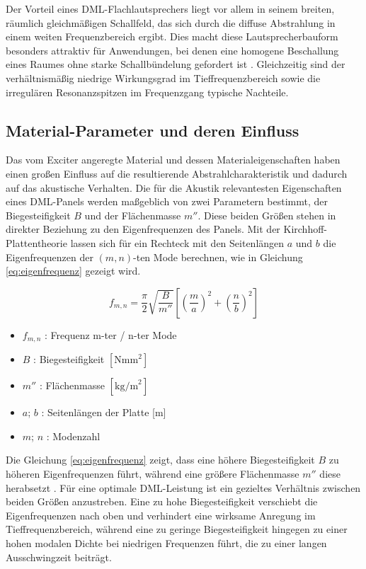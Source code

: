 Der Vorteil eines DML-Flachlautsprechers liegt vor allem in seinem breiten, räumlich gleichmäßigen Schallfeld, das sich durch die diffuse Abstrahlung in einem weiten Frequenzbereich ergibt. Dies macht diese Lautsprecherbauform besonders attraktiv für Anwendungen, bei denen eine homogene Beschallung eines Raumes ohne starke Schallbündelung gefordert ist \cite{Beer1999}. Gleichzeitig sind der verhältnismäßig niedrige Wirkungsgrad im Tieffrequenzbereich sowie die irregulären Resonanzspitzen im Frequenzgang typische Nachteile. 

\subsection{Material-Parameter und deren Einfluss}

Das vom Exciter angeregte Material und dessen Materialeigenschaften haben einen großen Einfluss auf die resultierende Abstrahlcharakteristik und dadurch auf das akustische Verhalten. Die für die Akustik relevantesten Eigenschaften eines DML-Panels werden maßgeblich von zwei Parametern bestimmt, der Biegesteifigkeit $B$ und der Flächenmasse $m''$. Diese beiden Größen stehen in direkter Beziehung zu den Eigenfrequenzen des Panels. Mit der Kirchhoff-Plattentheorie lassen sich für ein Rechteck mit den Seitenlängen $a$ und $b$ die Eigenfrequenzen der $(m, n)$-ten Mode berechnen, wie in Gleichung \ref{eq:eigenfrequenz} gezeigt wird. \cite{Cremer1996}

\begin{equation}
f_{m,n} = \frac{\pi}{2} \sqrt{\frac{B}{m''}} \left[ \left(\frac{m}{a}\right)^2 + \left(\frac{n}{b}\right)^2 \right]
\label{eq:eigenfrequenz}
\end{equation}

\begin{itemize}
    \item $f_{m,n}$ : Frequenz m-ter / n-ter Mode
    \item $B$ : Biegesteifigkeit $[\text{Nmm}^2]$
    \item $m''$ : Flächenmasse $[\text{kg/m}^2]$
    \item $a$; $b$ : Seitenlängen der Platte [m]
    \item $m$; $n$ : Modenzahl
\end{itemize}

Die Gleichung \ref{eq:eigenfrequenz} zeigt, dass eine höhere Biegesteifigkeit $B$ zu höheren Eigenfrequenzen führt, während eine größere Flächenmasse $m''$ diese herabsetzt \cite{Cremer1996}. Für eine optimale DML-Leistung ist ein gezieltes Verhältnis zwischen beiden Größen anzustreben. Eine zu hohe Biegesteifigkeit verschiebt die Eigenfrequenzen nach oben und verhindert eine wirksame Anregung im Tieffrequenzbereich, während eine zu geringe Biegesteifigkeit hingegen zu einer hohen modalen Dichte bei niedrigen Frequenzen führt, die zu einer langen Ausschwingzeit beiträgt.

